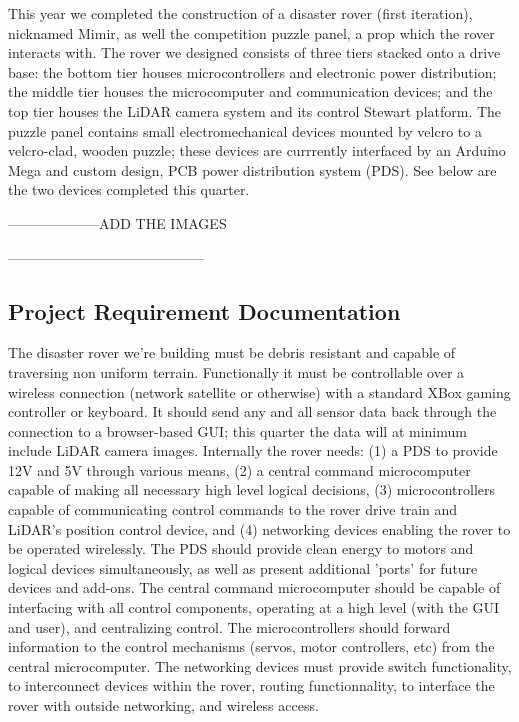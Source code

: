\documentclass[a4paper, 10pt]{article}
\begin{document}
	This year we completed the construction of a disaster rover (first iteration), nicknamed Mimir, as well the competition puzzle panel, a prop which the rover interacts with. The rover we designed consists of three tiers stacked onto a drive base: the bottom tier houses microcontrollers and electronic power distribution; the middle tier houses the microcomputer and communication devices; and the top tier houses the LiDAR camera system and its control Stewart platform. The puzzle panel contains small electromechanical devices mounted by velcro to a velcro-clad, wooden puzzle; these devices are currrently interfaced by an Arduino Mega and custom design, PCB power distribution system (PDS). See below are the two devices completed this quarter.

	--------------------ADD THE IMAGES
	
	------------------------------------------
	
\pagebreak

	\subsection*{Project Requirement Documentation}
	The disaster rover we're building must be debris resistant and capable of traversing non uniform terrain. Functionally it must be controllable over a wireless connection (network satellite or otherwise) with a standard XBox gaming controller or keyboard. It should send any and all sensor data back through the connection to a browser-based GUI; this quarter the data will at minimum include LiDAR camera images. Internally the rover needs: (1) a PDS to provide 12V and 5V through various means, (2) a central command microcomputer capable of making all necessary high level logical decisions, (3) microcontrollers capable of communicating control commands to the rover drive train and LiDAR's position control device, and (4) networking devices enabling the rover to be operated wirelessly. The PDS should provide clean energy to motors and logical devices simultaneously, as well as present additional 'ports' for future devices and add-ons. The central command microcomputer should be capable of interfacing with all control components, operating at a high level (with the GUI and user), and centralizing control. The microcontrollers should forward information to the control mechanisms (servos, motor controllers, etc) from the central microcomputer. The networking devices must provide switch functionality, to interconnect devices within the rover, routing functionnality, to interface the rover with outside networking, and wireless access.
	
\end{document}
